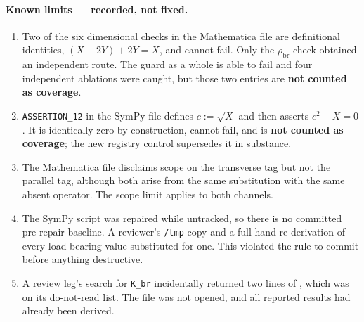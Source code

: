 \paragraph{Known limits --- recorded, not fixed.}
\begin{enumerate}[leftmargin=2.2em]
\item Two of the six dimensional checks in the Mathematica file are
definitional identities, \((X-2Y)+2Y=X\), and cannot fail. Only the
\(\rho_{\mathrm{br}}\) check obtained an independent route. The guard as a
whole is able to fail and four independent ablations were caught, but those
two entries are \textbf{not counted as coverage}.

\item \texttt{ASSERTION\_12} in the SymPy file defines
\(c:=\sqrt{X}\) and then asserts \(c^2-X=0\). It is identically zero by
construction, cannot fail, and is \textbf{not counted as coverage}; the new
registry control supersedes it in substance.

\item The Mathematica file disclaims scope on the transverse tag but not the
parallel tag, although both arise from the same substitution with the same
absent operator. The scope limit applies to both channels.

\item The SymPy script was repaired while untracked, so there is no committed
pre-repair baseline. A reviewer's \texttt{/tmp} copy and a full hand
re-derivation of every load-bearing value substituted for one. This violated
the rule to commit before anything destructive.

\item A review leg's search for \texttt{K\_br} incidentally returned two lines
of , which was on its
do-not-read list. The file was not opened, and all reported results had already
been derived.
\end{enumerate}
